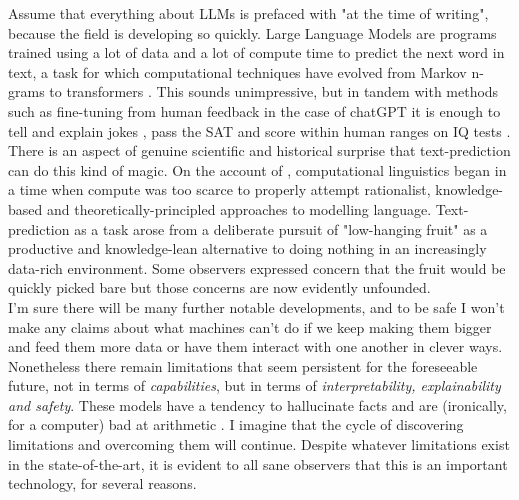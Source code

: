  Assume that everything about LLMs is prefaced with "at the time of writing", because the field is developing so quickly. Large Language Models are programs trained using a lot of data and a lot of compute time to predict the next word in text, a task for which computational techniques have evolved from Markov n-grams to transformers \citep{vaswani_attention_2017}. This sounds unimpressive, but in tandem with methods such as fine-tuning from human feedback in the case of chatGPT \citep{openai_chatgpt_2022} it is enough to tell and explain jokes \citep{bastian_google_2022}, pass the SAT \citep{teddy_teddynpc_i_2022} and score within human ranges on IQ tests \citep{thompson_gpt-35_2022}. There is an aspect of genuine scientific and historical surprise that text-prediction can do this kind of magic. On the account of \citep{mcshane_linguistics_2021}, computational linguistics began in a time when compute was too scarce to properly attempt rationalist, knowledge-based and theoretically-principled approaches to modelling language. Text-prediction as a task arose from a deliberate pursuit of "low-hanging fruit" as a productive and knowledge-lean alternative to doing nothing in an increasingly data-rich environment. Some observers \citep{church_pendulum_2011} expressed concern that the fruit would be quickly picked bare but those concerns are now evidently unfounded.\\

I'm sure there will be many further notable developments, and to be safe I won't make any claims about what machines can't do if we keep making them bigger and feed them more data or have them interact with one another in clever ways. Nonetheless there remain limitations that seem persistent for the foreseeable future, not in terms of \emph{capabilities}, but in terms of \emph{interpretability, explainability and safety}. These models have a tendency to hallucinate facts and are (ironically, for a computer) bad at arithmetic \citep{hendrycks_measuring_2021}. I imagine that the cycle of discovering limitations and overcoming them will continue. Despite whatever limitations exist in the state-of-the-art, it is evident to all sane observers that this is an important technology, for several reasons.

